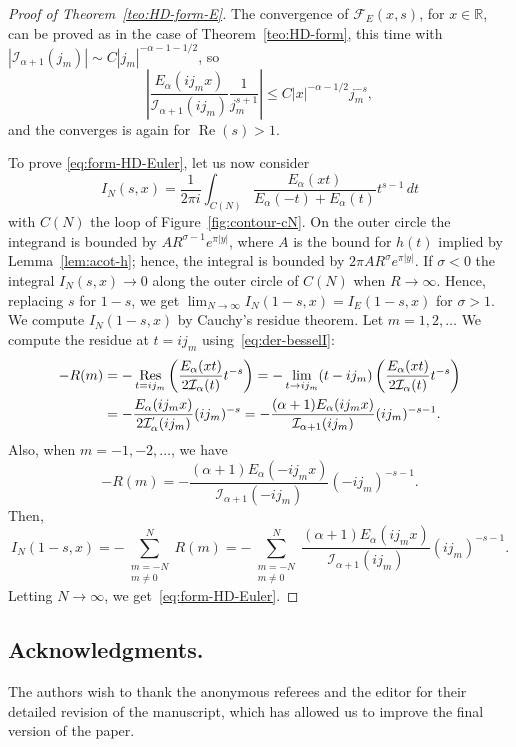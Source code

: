\documentclass[a4paper]{amsart}
\newcommand{\R}{\mathbb{R}}
\newcommand{\I}{\mathcal{I}}
\newcommand{\Ea}{E_{\alpha}}
\renewcommand{\Re}{\operatorname{Re}}
\newcommand{\Res}{\operatornamewithlimits{Res}}
\theoremstyle{plain}
\theoremstyle{definition}
\theoremstyle{remark}
\numberwithin{equation}{section}
\begin{document}
\begin{proof}[Proof of Theorem~\ref{teo:HD-form-E}]
The convergence of $\mathcal{F}_E(x,s)$, for $x \in \R$, can be proved as in the case of Theorem~\ref{teo:HD-form}, this time with $|\I_{\alpha+1}(j_m)| \sim C |j_m|^{-\alpha-1-1/2}$, so
\[
  \left| \frac{\Ea( i j_m x)}{\I_{\alpha+1}(i j_m)} \frac{1}{j_m^{s+1}} \right|
  \le C |x|^{-\alpha-1/2} j_m^{-s},
\]
and the converges is again for $\Re(s)>1$.

To prove \eqref{eq:form-HD-Euler}, let us now consider 
\[
    I_N(s,x) = \frac{1}{2\pi i} \int_{C(N)}\frac{\Ea(xt)}{\Ea(-t)+\Ea(t)} t^{s-1}\,dt
\]
with $C(N)$ the loop of Figure~\ref{fig:contour-cN}.
On the outer circle the integrand is bounded by $AR^{\sigma-1}e^{\pi |y|}$, where $A$ is the bound for $h(t)$ implied by Lemma~\ref{lem:acot-h}; hence, the integral is bounded by $2\pi AR^{\sigma}e^{\pi |y|}$. If $\sigma < 0$ the integral $I_N(s,x)\to 0$ along the outer circle of $C(N)$ when $R\to \infty$.
Hence, replacing $s$ for $1-s$, we get $\lim_{N\to \infty} I_N(1-s,x) = I_E(1-s,x)$ for $\sigma > 1$. We compute $I_N(1-s,x)$ by Cauchy's residue theorem. Let $m=1,2,\dots$ We compute the residue at $t=i j_m$ using~\eqref{eq:der-besselI}:
\begin{align*}
    -R(m) & = -\Res_{t=i j_m} \left(\frac{\Ea(xt)}{2\I_{\alpha}(t)}t^{-s}\right) 
    = -\lim_{t \to i j_m}(t - ij_m) \left(\frac{\Ea(xt)}{2\I_{\alpha}(t)}t^{-s}\right) \\
    & = -\frac{\Ea(i j_m x)}{2\I_{\alpha}^{'}(i j_m)}(i j_m)^{-s} 
    = -\frac{(\alpha+1)\Ea(i j_m x)}{\I_{\alpha+1}(i j_m)}(i j_m)^{-s-1}.
\end{align*}
Also, when $m=-1,-2,\dots$, we have
\[
    -R(m) = -\frac{(\alpha+1)\Ea(-i j_m x)}{\I_{\alpha+1}(-i j_m)}(-i j_m)^{-s-1}.
\]
Then,
\begin{equation*}
I_N(1-s,x) = -\sum_{\substack{m=-N\\m \ne 0}}^{N} R(m) 
= -\sum_{\substack{m=-N\\m \ne 0}}^{N} 
\frac{(\alpha+1)\Ea(i j_m x)}{\I_{\alpha+1}(i j_m)}(i j_m)^{-s-1}.
\end{equation*}
Letting $N\to \infty$, we get~\eqref{eq:form-HD-Euler}.
\end{proof}

\subsection*{Acknowledgments.} 
The authors wish to thank the anonymous referees and the editor for their detailed revision of the manuscript, which has allowed us to improve the final version of the paper.
\end{document}
